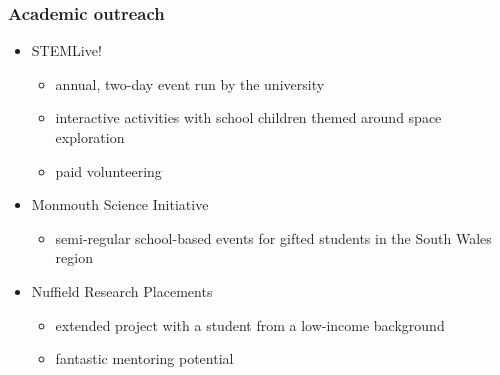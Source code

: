 \documentclass{beamer}
\begin{document}
\begin{frame}
    \frametitle{Academic outreach}
    \begin{itemize}
        \item[] STEMLive!
            \begin{itemize}
                \item annual, two-day event run by the university
                \item interactive activities with school children themed around
                    space exploration
                \item paid volunteering
            \end{itemize}
        \item[] Monmouth Science Initiative
            \begin{itemize}
                \item semi-regular school-based events for gifted students in
                    the South Wales region
            \end{itemize}
        \item[] Nuffield Research Placements
            \begin{itemize}
                \item extended project with a student from a low-income
                    background
                \item fantastic mentoring potential
            \end{itemize}
    \end{itemize}
\end{frame}
\end{document}
